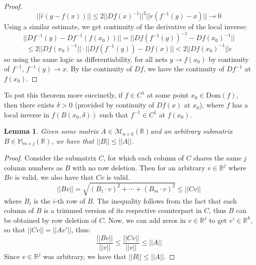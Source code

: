 \documentclass[10pt,letterpaper]{article} %
\newtheorem{lem}{Lemma}[section]
\begin{document}
\begin{proof}
\begin{equation*}
||\hat{r}(y - f(x))|| \leqslant 2||Df(x)^{-1}||^2||r(f^{-1}(y) - x)|| \xrightarrow{} 0
\end{equation*}
Using a similar estimate, we get continuity of the derivative of the local inverse:
\begin{equation*}
||Df^{-1}(y) - Df^{-1}(f(x_0))|| = ||Df(f^{-1}(y))^{-1} - Df(x_0)^{-1}||
\end{equation*}
\begin{equation*}
 \leqslant 2||Df(x_0)^{-1}|| \cdot ||Df(f^{-1}(y)) - Df(x)|| < 2||Df(x_0)^{-1}||\epsilon
\end{equation*}
so using the same logic as differentiability, for all nets $y \xrightarrow{} f(x_0)$ by continuity of $f^{-1}$, $f^{-1}(y) \xrightarrow{} x$. By the continuity of $Df$, we have the continuity of $Df^{-1}$ at $f(x_0)$.
\end{proof}
To put this theorem more succinctly, if $f \in C^1$ at some point $x_0 \in \text{Dom}(f)$, then there exists $\delta > 0$ (provided by continuity of $Df(x)$ at $x_0$), where $f$ has a local inverse in $f(B(x_0, \delta))$ such that $f^{-1} \in C^1$ at $f(x_0)$.\\

\begin{lem}
Given some matrix $A \in \mathcal{M}_{n \times k}(\mathbb{R})$and an arbitrary submatrix $B \in \mathbb{M}_{m \times j}(\mathbb{R})$, we have that $||B|| \leqslant ||A||$.
\end{lem}
\begin{proof}
Consider the submatrix $C$, for which each column of $C$ shares the same $j$ column numbers as $B$ with no row deletion. Then for an arbitrary $v \in \mathbb{R}^j$ where $Bv$ is valid, we also have that $Cv$ is valid.
\begin{equation*}
||Bv|| = \sqrt{(B_1 \cdot v)^2 + \cdots + (B_m \cdot v)^2} \leqslant ||Cv||
\end{equation*}
where $B_i$ is the $i$-th row of $B$. The inequality follows from the fact that each column of $B$ is a trimmed version of its respective counterpart in $C$, thus $B$ can be obtained by row deletion of $C$. Now, we can add zeros in $v \in \mathbb{R}^j$ to get $v' \in \mathbb{R}^k$, so that $||Cv|| = ||Av'||$, thus:
\begin{equation*}
\frac{||Bv||}{||v||} \leqslant \frac{||Cv||}{||v||} \leqslant ||A||
\end{equation*}
Since $v \in \mathbb{R}^j$ was arbitrary, we have that $||B|| \leqslant ||A||$.
\end{proof}
\end{document}

